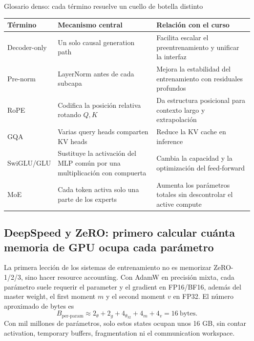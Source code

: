 \begin{knowledgebox}{Glosario denso: cada término resuelve un cuello de botella distinto}
\begin{tabularx}{\textwidth}{L{0.17\textwidth} L{0.30\textwidth} X}
\toprule
Término & Mecanismo central & Relación con el curso \\
\midrule
Decoder-only & Un solo causal generation path & Facilita escalar el preentrenamiento y unificar la interfaz \\
Pre-norm & LayerNorm antes de cada subcapa & Mejora la estabilidad del entrenamiento con residuales profundos \\
RoPE & Codifica la posición relativa rotando $Q,K$ & Da estructura posicional para contexto largo y extrapolación \\
GQA & Varias query heads comparten KV heads & Reduce la KV cache en inference \\
SwiGLU/GLU & Sustituye la activación del MLP común por una multiplicación con compuerta & Cambia la capacidad y la optimización del feed-forward \\
MoE & Cada token activa solo una parte de los experts & Aumenta los parámetros totales sin descontrolar el active compute \\
\bottomrule
\end{tabularx}
\end{knowledgebox}


\subsection{DeepSpeed y ZeRO: primero calcular cuánta memoria de GPU ocupa cada parámetro}

La primera lección de los sistemas de entrenamiento no es memorizar ZeRO-1/2/3, sino hacer resource accounting. Con AdamW en precisión mixta, cada parámetro suele requerir el parameter y el gradient en FP16/BF16, además del master weight, el first moment $m$ y el second moment $v$ en FP32. El número aproximado de bytes es
\[
B_{\text{per-param}}\approx 2_{\theta}+2_g+4_{\theta_{32}}+4_m+4_v=16\ \text{bytes}.
\]
Con mil millones de parámetros, solo estos states ocupan unos 16 GB, sin contar activation, temporary buffers, fragmentation ni el communication workspace.

